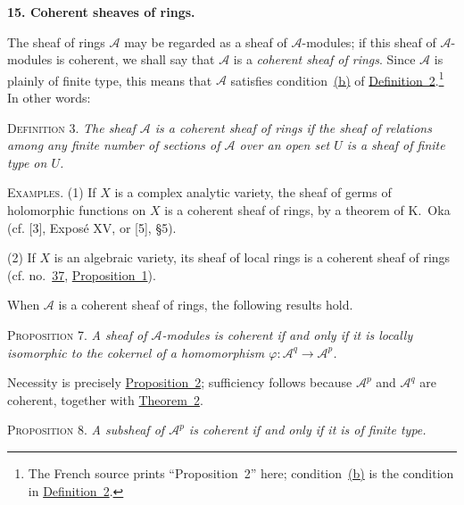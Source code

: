 
\medskip
{}\label{fac:I:2:no:15}
\textbf{15. Coherent sheaves of rings.}

The sheaf of rings $\mathcal{A}$ may be regarded as a sheaf of $\mathcal{A}$-modules; if this sheaf of $\mathcal{A}$-modules is coherent, we shall say that $\mathcal{A}$ is a \emph{coherent sheaf of rings}. Since $\mathcal{A}$ is plainly of finite type, this means that $\mathcal{A}$ satisfies condition~\hyperref[fac:I:2:no:12:def:2:item:b]{(b)} of \hyperref[fac:I:2:no:12:def:2]{Definition~2}.\footnote{The French source prints ``Proposition~2'' here; condition~\hyperref[fac:I:2:no:12:def:2:item:b]{(b)} is the condition in \hyperref[fac:I:2:no:12:def:2]{Definition~2}.} In other words:

\label{fac:I:2:no:15:def:3}
\textsc{Definition 3.} \textit{The sheaf $\mathcal{A}$ is a coherent sheaf of rings if the sheaf of relations among any finite number of sections of $\mathcal{A}$ over an open set $U$ is a sheaf of finite type on $U$.}

\textsc{Examples.} \label{fac:I:2:no:15:example:1}(1) If $X$ is a complex analytic variety, the sheaf of germs of holomorphic functions on $X$ is a coherent sheaf of rings, by a theorem of K.~Oka (cf. [3], Expos\'e XV, or [5], \S5).

\label{fac:I:2:no:15:example:2}(2) If $X$ is an algebraic variety, its sheaf of local rings is a coherent sheaf of rings (cf. no.~\hyperref[fac:II:2:no:37]{37}, \hyperref[fac:II:2:no:37:prop:1]{Proposition~1}).

When $\mathcal{A}$ is a coherent sheaf of rings, the following results hold.

\label{fac:I:2:no:15:prop:7}
\textsc{Proposition 7.} \textit{A sheaf of $\mathcal{A}$-modules is coherent if and only if it is locally isomorphic to the cokernel of a homomorphism $\varphi:\mathcal{A}^q\to\mathcal{A}^p$.}

Necessity is precisely \hyperref[fac:I:2:no:12:prop:2]{Proposition~2}; sufficiency follows because $\mathcal{A}^p$ and $\mathcal{A}^q$ are coherent, together with \hyperref[fac:I:2:no:13:thm:2]{Theorem~2}.

\label{fac:I:2:no:15:prop:8}
\textsc{Proposition 8.} \textit{A subsheaf of $\mathcal{A}^p$ is coherent if and only if it is of finite type.}


